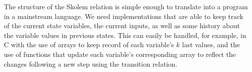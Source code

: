 The structure of the Skolem relation is simple enough to translate
into a program in a mainstream language.
We need implementations that are able to keep track of the
current state variables, the current inputs, as well as some history
about the variable values in previous states. This can easily be handled, for
example, in C with the use of arrays to keep record of each variable's $k$ last
values, and the use of functions that update each variable's corresponding array
to reflect the changes following a new step using the transition relation.
